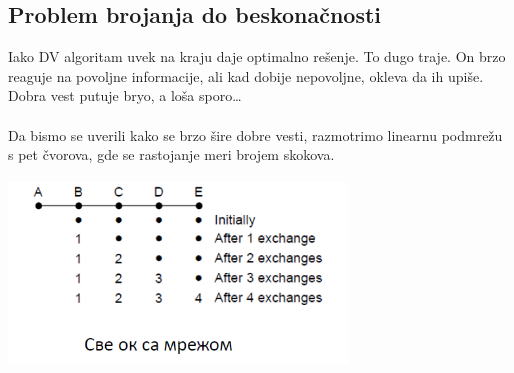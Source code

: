 \documentclass{article} %
\begin{document}
\subsection{Problem brojanja do beskonačnosti}
Iako DV algoritam uvek na kraju daje optimalno rešenje. To dugo traje. On brzo reaguje na povoljne informacije, ali kad dobije nepovoljne, okleva da ih upiše. Dobra vest putuje bryo, a loša sporo…\\
\\
Da bismo se uverili kako se brzo šire dobre vesti, razmotrimo linearnu podmrežu s pet čvorova, gde se rastojanje meri brojem skokova.\\
\begin{center}
		\includegraphics[width=9cm, height=5cm]{dobra}\\
\end{center}
\end{document}

